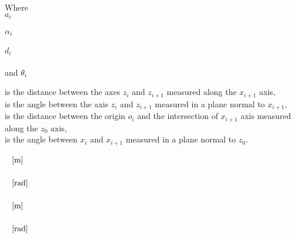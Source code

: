 \begin{minipage}[t]{0.20\textwidth}
Where\\
\hspace*{8mm} $a_i$ \\\\
\hspace*{8mm} $\alpha_i$ \\\\
\hspace*{8mm} $d_i$ \\\\
and \hspace*{0.7mm} $\theta_i$	
\end{minipage}
\begin{minipage}[t]{0.68\textwidth}
\vspace*{2mm}
is the distance between the axes $z_i$ and $z_{i+1}$ measured along the $x_{i+1}$ axis,\\
is the angle between the axis $z_i$ and $z_{i+1}$ measured in a plane normal to $x_{i+1}$,\\
is the distance between the origin $o_i$ and the intersection of $x_{i+1}$ axis measured along the $z_0$ axis,\\
is the angle between $x_i$ and $x_{i+1}$ measured in a plane normal to $z_0$.
\end{minipage}
\begin{minipage}[t]{0.10\textwidth}
\vspace*{2mm}
\textcolor{White}{te}$\enhed{m}$\\\\
\textcolor{White}{te}$\enhed{rad}$\\\\
\textcolor{White}{te}$\enhed{m}$\\\\
\textcolor{White}{te}$\enhed{rad}$
\end{minipage}









